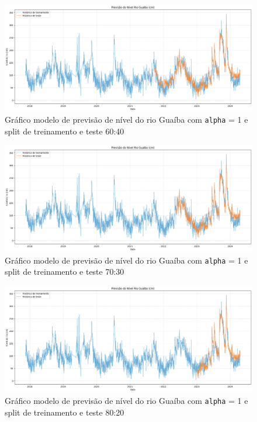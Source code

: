 \begin{figure}[H]
	\caption{\label{fig:comparacao_radiacao_nivel_rio}Gráfico modelo de previsão de nível do rio Guaíba com \texttt{alpha} = 1 e split de treinamento e teste 60:40}
	\begin{center}
		\includegraphics[scale=0.35]{figuras/modelo_previsao_60_40.png}
	\end{center}
\end{figure}

\begin{figure}[H]
	\caption{\label{fig:comparacao_radiacao_nivel_rio}Gráfico modelo de previsão de nível do rio Guaíba com \texttt{alpha} = 1 e split de treinamento e teste 70:30}
	\begin{center}
		\includegraphics[scale=0.35]{figuras/modelo_previsao_70_30.png}
	\end{center}
\end{figure}

\begin{figure}[H]
	\caption{\label{fig:comparacao_radiacao_nivel_rio}Gráfico modelo de previsão de nível do rio Guaíba com \texttt{alpha} = 1 e split de treinamento e teste 80:20}
	\begin{center}
		\includegraphics[scale=0.35]{figuras/modelo_previsao_80_20.png}
	\end{center}
\end{figure}

